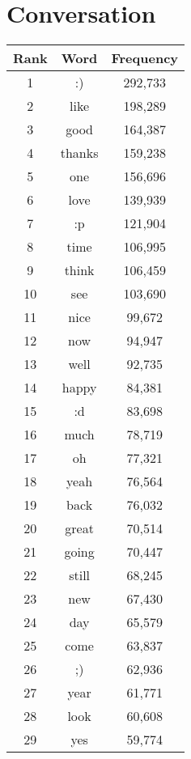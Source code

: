 \section{Conversation}
\label{sec:groups}

\clearpage
\begin{table}[!htbp]
\begin{minipage}[b]{.5\textwidth}
	\centering
	\begin{tabular}{|c|c|c|} %
		\hline
		\textbf{Rank} & \textbf{Word} & \textbf{Frequency}  \\ \hline
		1 & :) & 292,733 \\ \hline
		2 & like & 198,289 \\ \hline
		3 & good & 164,387 \\ \hline
		4 & thanks & 159,238 \\ \hline
		5 & one & 156,696 \\ \hline
		6 & love & 139,939 \\ \hline
		7 & :p & 121,904 \\ \hline
		8 & time & 106,995 \\ \hline
		9 & think & 106,459 \\ \hline
		10 & see & 103,690 \\ \hline
		11 & nice & 99,672 \\ \hline
		12 & now & 94,947 \\ \hline
		13 & well & 92,735 \\ \hline
		14 & happy & 84,381 \\ \hline
		15 & :d & 83,698 \\ \hline
		16 & much & 78,719 \\ \hline
		17 & oh & 77,321 \\ \hline
		18 & yeah & 76,564 \\ \hline
		19 & back & 76,032 \\ \hline
		20 & great & 70,514 \\ \hline
		21 & going & 70,447 \\ \hline
		22 & still & 68,245 \\ \hline
		23 & new & 67,430 \\ \hline
		24 & day & 65,579 \\ \hline
		25 & come & 63,837 \\ \hline
		26 & ;) & 62,936 \\ \hline
		27 & year & 61,771 \\ \hline
		28 & look & 60,608 \\ \hline
		29 & yes & 59,774 \\ \hline

\end{tabular}
\end{minipage}
\end{table}
